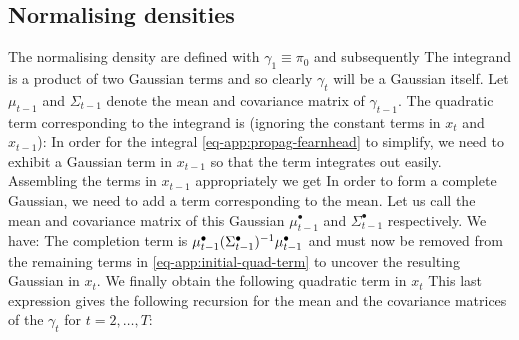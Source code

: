\subsection{\label{app:normalising-density-fearnhead-lg}Normalising densities}
%
The normalising density are defined with $\gamma_{1}\equiv \pi_{0}$ and subsequently 
%
%
The integrand is a product of two Gaussian terms and so clearly $\gamma_{t}$ will be a Gaussian itself. Let $\mu_{t-1}$ and $\Sigma_{t-1}$ denote the mean and covariance matrix of $\gamma_{t-1}$. The quadratic term corresponding to the integrand is (ignoring the constant terms in $x_{t}$ and $x_{t-1}$):
%
%
In order for the integral \eqref{eq-app:propag-fearnhead} to simplify, we need to exhibit a Gaussian term in $x_{t-1}$ so that the term integrates out easily. Assembling the terms in $x_{t-1}$ appropriately we get
%
%
In order to form a complete Gaussian, we need to add a term corresponding to the mean. Let us call the mean and covariance matrix of this Gaussian $\mu^{\bullet}_{t-1}$ and $\Sigma^{\bullet}_{t-1}$ respectively. We have:
%
%
The completion term is $\mu^{\bullet}_{t-1}(\Sigma^{\bullet}_{t-1})^{-1} \mu^{\bullet}_{t-1}$ and must now be removed from the remaining terms in \eqref{eq-app:initial-quad-term} to uncover the resulting Gaussian in $x_{t}$. We finally obtain the following quadratic term in $x_{t}$
%
%
This last expression gives the following recursion for the mean and the covariance matrices of the $\gamma_{t}$ for $t=2,\dots, T$:
%
%

